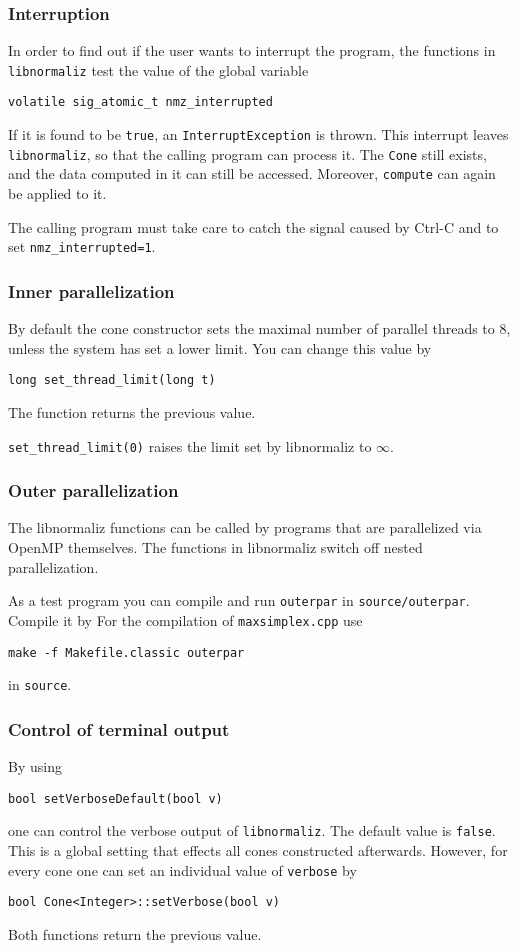 \documentclass[12pt,a4paper]{scrartcl}
\theoremstyle{definition}
\begin{document}
\begin{small}
\subsubsection{Interruption}

In order to find out if the user wants to interrupt the program, the functions in \verb|libnormaliz| test the value of the global variable
\begin{Verbatim}
volatile sig_atomic_t nmz_interrupted
\end{Verbatim}
If it is found to be \verb|true|, an \verb|InterruptException| is thrown. This interrupt leaves \verb|libnormaliz|, so that the calling program can process it. The \verb|Cone| still exists, and the data computed in it can still be accessed. Moreover, \verb|compute| can again be applied to it.

The calling program must take care to catch the signal caused by Ctrl-C and to set \verb|nmz_interrupted=1|.

\subsubsection{Inner parallelization}

By default the cone constructor sets the maximal number of parallel threads to $8$, unless the system has set a lower limit. You can change this value by
\begin{Verbatim}
long set_thread_limit(long t)
\end{Verbatim}
The function returns the previous value.

\verb|set_thread_limit(0)| raises the limit set by libnormaliz to $\infty$.

\subsubsection{Outer parallelization}

The libnormaliz functions can be called by programs that are parallelized via OpenMP themselves. The functions in libnormaliz switch off nested parallelization.

As a test program you can compile and run \verb|outerpar| in \verb|source/outerpar|. Compile it by For the compilation of \verb|maxsimplex.cpp| use
\begin{Verbatim}
make -f Makefile.classic outerpar
\end{Verbatim}
in \verb|source|.

\subsubsection{Control of terminal output}
By using
\begin{Verbatim}
bool setVerboseDefault(bool v)
\end{Verbatim}
one can control the verbose output of \verb|libnormaliz|. The default value is \verb|false|. This is a global setting that effects all cones constructed afterwards. However, for every cone one can set an individual value of \verb|verbose| by
\begin{Verbatim}
bool Cone<Integer>::setVerbose(bool v)
\end{Verbatim}
Both functions return the previous value.


\end{small}
\end{document}
